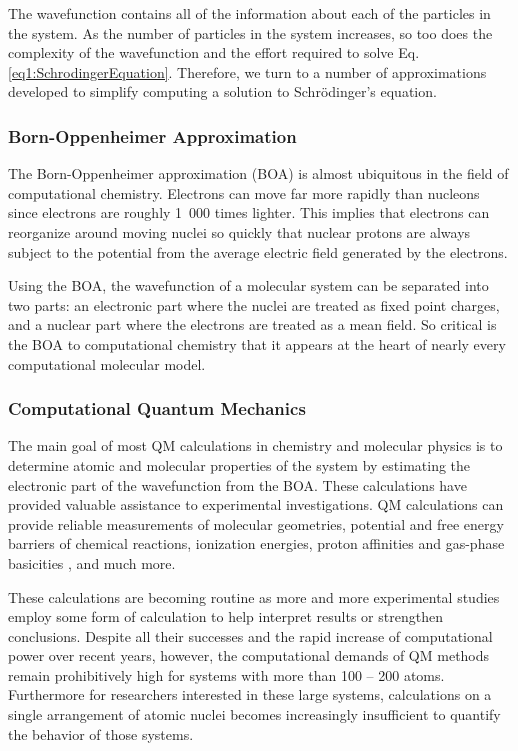 The wavefunction contains all of the information about each of the particles in
the system. As the number of particles in the system increases, so too does the
complexity of the wavefunction and the effort required to solve Eq.
\ref{eq1:SchrodingerEquation}. Therefore, we turn to a number of approximations
developed to simplify computing a solution to Schr\"odinger's equation.

\subsubsection{Born-Oppenheimer Approximation}

The Born-Oppenheimer approximation (BOA) is almost ubiquitous in the field of
computational chemistry. Electrons can move far more rapidly than nucleons since
electrons are roughly \mbox{1 000} times lighter. This implies that electrons
can reorganize around moving nuclei so quickly that nuclear protons are always
subject to the potential from the average electric field generated by the
electrons.

Using the BOA, the wavefunction of a molecular system can be separated into two
parts: an electronic part where the nuclei are treated as fixed point charges,
and a nuclear part where the electrons are treated as a mean field.
\cite{McQuarrie_Book_PhysChem_1997} So critical is the BOA to computational
chemistry that it appears at the heart of nearly every computational molecular
model.

\subsubsection{Computational Quantum Mechanics}
\label{sec1:CompQuantumMech}

The main goal of most QM calculations in chemistry and molecular physics is to
determine atomic and molecular properties of the system by estimating the
electronic part of the wavefunction from the BOA. These calculations have
provided valuable assistance to experimental investigations. QM calculations
can provide reliable measurements of molecular geometries,
\cite{Jeletic_JOrganometChem_2011_v696_p3127} potential and free energy barriers
of chemical reactions, \cite{Chandrasekhar_JAmChemSoc_1985_v107_p154} ionization
energies, \cite{Watson_ChemPhysLett_2013_v555_p235} proton affinities and
gas-phase basicities \cite{Range_PhysChemChemPhys_2005_v7_p3070}, and much more.
\cite{Hehre_Ab_inito_MO_Theory_Book_1986}

These calculations are becoming routine as more and more experimental studies
employ some form of calculation to help interpret results or strengthen
conclusions. Despite all their successes and the rapid increase of computational
power over recent years, however, the computational demands of QM methods remain
prohibitively high for systems with more than 100 -- 200 atoms. Furthermore for
researchers interested in these large systems, calculations on a single
arrangement of atomic nuclei becomes increasingly insufficient to quantify the
behavior of those systems.

